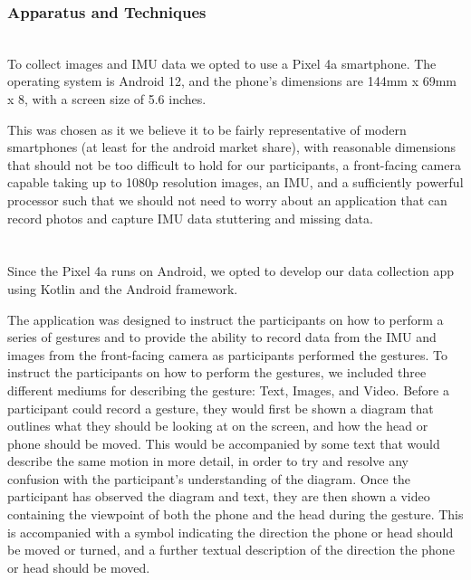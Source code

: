 \subsubsection{Apparatus and Techniques}\nl %
\\
To collect images and IMU data we opted to use a Pixel 4a smartphone.
The operating system is Android 12, and the phone's dimensions are 144mm x 69mm x 8, with a screen size of 5.6 inches.

This was chosen as it we believe it to be fairly representative of modern smartphones (at least for the android market share), with reasonable dimensions that should not be too difficult to hold for our participants, a front-facing camera capable taking up to 1080p resolution images, an IMU, and a sufficiently powerful processor such that we should not need to worry about an application that can record photos and capture IMU data stuttering and missing data.
\\
\\
\\
Since the Pixel 4a runs on Android, we opted to develop our data collection app using Kotlin and the Android framework.

The application was designed to instruct the participants on how to perform a series of gestures and to provide the ability to record data from the IMU and images from the front-facing camera as participants performed the gestures.
To instruct the participants on how to perform the gestures, we included three different mediums for describing the gesture: Text, Images, and Video.
Before a participant could record a gesture, they would first be shown a diagram that outlines what they should be looking at on the screen, and how the head or phone should be moved. This would be accompanied by some text that would describe the same motion in more detail, in order to try and resolve any confusion with the participant's understanding of the diagram.
Once the participant has observed the diagram and text, they are then shown a video containing the viewpoint of both the phone and the head during the gesture. This is accompanied with a symbol indicating the direction the phone or head should be moved or turned, and a further textual description of the direction the phone or head should be moved.

